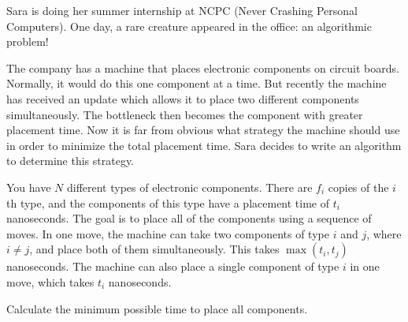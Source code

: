 

%

Sara is doing her summer internship at NCPC (Never Crashing Personal Computers). One day, a rare creature
appeared in the office: an algorithmic problem!

The company has a machine that places electronic components on circuit boards. Normally, it would 
do this one component at a time. But recently the machine has received an update which allows it 
to place two different components simultaneously. The bottleneck then becomes the component with greater placement time. 
Now it is far from obvious what strategy the machine should use in order to minimize the total placement
time. Sara decides to write an algorithm to determine this strategy. 

You have $N$ different types of electronic components. There are $f_i$ copies of the $i$th type, and 
the components of this type have a placement time of $t_i$ nanoseconds.
The goal is to place all of the components using a sequence of moves.
In one move, the machine can take two components of type $i$ and $j$, where $i \neq j$, and place 
both of them simultaneously. This takes $\max(t_i, t_j)$ nanoseconds. 
The machine can also place a single component of type $i$ in one move, which takes $t_i$ nanoseconds.

Calculate the minimum possible time to place all components.

